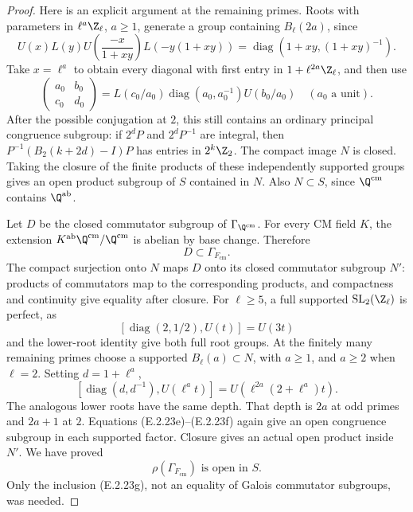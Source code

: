 \begin{proof}
Here is an explicit argument at the remaining primes.
Roots with parameters in \(\ell^a\Z_\ell\), \(a\geq1\),
generate a group containing \(B_\ell(2a)\), since
\[
 U(x)L(y)U\!\left(\frac{-x}{1+xy}\right)
 L\!\left(-y(1+xy)\right)
       =\operatorname{diag}(1+xy,(1+xy)^{-1}).
 \tag{E.2.23e}
\]
Take \(x=\ell^a\) to obtain every diagonal with first
entry in \(1+\ell^{2a}\Z_\ell\), and then use
\[
 \begin{pmatrix}a_0&b_0\\c_0&d_0\end{pmatrix}
 =L(c_0/a_0)\operatorname{diag}(a_0,a_0^{-1})U(b_0/a_0)
 \quad(a_0\text{ a unit}).
 \tag{E.2.23f}
\]
After the possible conjugation at \(2\), this still contains
an ordinary principal congruence subgroup: if \(2^dP\)
and \(2^dP^{-1}\) are integral, then
\(P^{-1}(B_2(k+2d)-I)P\) has entries in \(2^k\Z_2\).
The compact image \(N\) is closed. Taking the closure of
the finite products of these independently supported groups
gives an open product subgroup of \(S\) contained in \(N\).
Also \(N\subset S\), since \(\Q^{\mathrm{cm}}\)
contains \(\Q^{\mathrm{ab}}\).

Let \(D\) be the closed commutator subgroup of
\(\Gamma_{\Q^{\mathrm{cm}}}\). For every CM field \(K\),
the extension \(K^{\mathrm{ab}}\Q^{\mathrm{cm}}/
\Q^{\mathrm{cm}}\) is abelian by base change. Therefore
\[
 D\subset\Gamma_{F_{\mathrm{cm}}}.
 \tag{E.2.23g}
\]
The compact surjection onto \(N\) maps \(D\) onto its
closed commutator subgroup \(N'\): products of commutators
map to the corresponding products, and compactness and
continuity give equality after closure.
For \(\ell\geq5\), a full supported
\(\operatorname{SL}_2(\Z_\ell)\) is perfect, as
\[
 [\operatorname{diag}(2,1/2),U(t)]=U(3t)
\]
and the lower-root identity give both full root groups.
At the finitely many remaining primes choose a supported
\(B_\ell(a)\subset N\), with \(a\geq1\), and
\(a\geq2\) when \(\ell=2\). Setting \(d=1+\ell^a\),
\[
 [\operatorname{diag}(d,d^{-1}),U(\ell^at)]
       =U\!\left(\ell^{2a}(2+\ell^a)t\right).
 \tag{E.2.23h}
\]
The analogous lower roots have the same depth. That depth
is \(2a\) at odd primes and \(2a+1\) at \(2\).
Equations (E.2.23e)--(E.2.23f) again give an open congruence
subgroup in each supported factor. Closure gives an actual
open product inside \(N'\). We have proved
\[
 \rho(\Gamma_{F_{\mathrm{cm}}})
       \text{ is open in }S.
 \tag{E.2.23i}
\]
Only the inclusion (E.2.23g), not an equality of Galois
commutator subgroups, was needed.


\end{proof}
